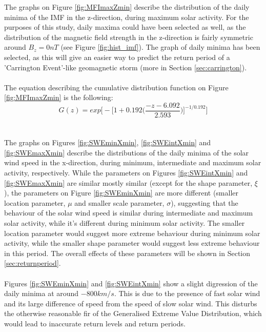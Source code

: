 \documentclass[12pt]{article}
\begin{document}
        The graphs on Figure \ref{fig:MFImaxZmin} describe the distribution of the daily minima of the IMF in the z-direction, during maximum solar activity. For the purposes of this study, daily maxima could have been selected as well, as the distribution of the magnetic field strength in the z-direction is fairly symmetric around $B_z=0nT$ (see Figure \ref{fig:hist_imf}). The graph of daily minima has been selected, as this will give an easier way to predict the return period of a 'Carrington Event'-like geomagnetic storm (more in Section \ref{sec:carrington}).\\ \\
        The equation describing the cumulative distribution function on Figure \ref{fig:MFImaxZmin} is the following:
        \begin{equation}
            G(z) = exp\Bigg [-\Bigg [1+0.192 \Bigg (\frac{-z-6.092}{2.593}\Bigg )\Bigg ]^{-1/0.192}\Bigg ]
        \end{equation}\\ \\
        The graphs on Figures \ref{fig:SWEminXmin}, \ref{fig:SWEintXmin} and \ref{fig:SWEmaxXmin} describe the distributions of the daily minima of the solar wind speed in the x-direction, during minimum, intermediate and maximum solar activity, respectively. While the parameters on Figures \ref{fig:SWEintXmin} and \ref{fig:SWEmaxXmin} are similar mostly similar (except for the shape parameter, $\xi$), the parameters on Figure \ref{fig:SWEminXmin} are more different (smaller location parameter, $\mu$ and smaller scale parameter, $\sigma$), suggesting that the behaviour of the solar wind speed is similar during intermediate and maximum solar activity, while it's different during minimum solar activity. The smaller location parameter would suggest more extreme behaviour during minimum solar activity, while the smaller shape parameter would suggest less extreme behaviour in this period. The overall effects of these parameters will be shown in Section \ref{sec:returnperiod}.\\ \\
        Figures \ref{fig:SWEminXmin} and \ref{fig:SWEintXmin} show a slight digression of the daily minima at around $-800km/s$. This is due to the presence of fast solar wind and its large difference of speed from the speed of slow solar wind. This disturbs the otherwise reasonable fir of the Generalised Extreme Value Distribution, which would lead to inaccurate return levels and return periods.\\ \\
\end{document}
